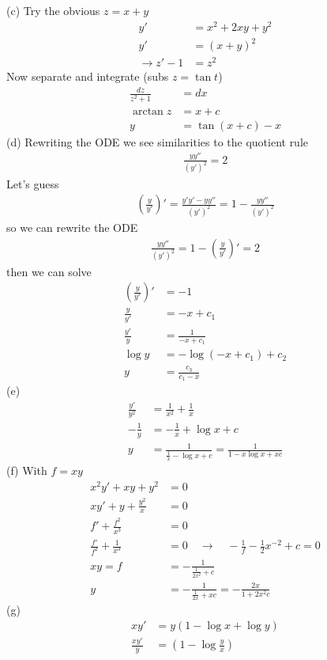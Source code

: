 \documentclass[../main.tex]{subfiles}
\begin{document}
(c) Try the obvious $z=x+y$
\begin{align}
y'&=x^2+2xy+y^2\\
y'&=(x+y)^2\\
\rightarrow z'-1&=z^2
\end{align}
Now separate and integrate (subs $z=\tan t$)
\begin{align}
\frac{dz}{z^2+1}&=dx\\
\arctan z&=x+c\\
y&=\tan(x+c)-x
\end{align}
(d) Rewriting the ODE we see similarities to the quotient rule
\begin{align}
\frac{yy''}{(y')^2}=2
\end{align}
Let's guess
\begin{align}
\left(\frac{y}{y'}\right)'=\frac{y'y'-yy''}{(y')^2}=1-\frac{yy''}{(y')^2}
\end{align}
so we can rewrite the ODE
\begin{align}
\frac{yy''}{(y')^2}=1-\left(\frac{y}{y'}\right)'=2
\end{align}
then we can solve
\begin{align}
\left(\frac{y}{y'}\right)'&=-1\\
\frac{y}{y'}&=-x+c_1\\
\frac{y'}{y}&=\frac{1}{-x+c_1}\\
\log y&=-\log(-x+c_1)+c_2\\
y&=\frac{c_3}{c_1-x}
\end{align}
(e)
\begin{align}
\frac{y'}{y^2}&=\frac{1}{x^2}+\frac{1}{x}\\
-\frac{1}{y}&=-\frac{1}{x}+\log x+c\\
y&=\frac{1}{\frac{1}{x}-\log x+c}=\frac{1}{1-x\log x+xc}
\end{align}
(f) With $f=xy$
\begin{align}
x^2y'+xy+y^2&=0\\
xy'+y+\frac{y^2}{x}&=0\\
f'+\frac{f^2}{x^3}&=0\\
\frac{f'}{f^2}+\frac{1}{x^3}&=0
\quad\rightarrow\quad-\frac{1}{f}-\frac{1}{2}x^{-2}+c=0\\
xy=f&=-\frac{1}{\frac{1}{2x^2}+c}\\
y&=-\frac{1}{\frac{1}{2x}+xc}=-\frac{2x}{1+2x^2c}
\end{align}
(g)
\begin{align}
xy'&=y(1-\log x+\log y)\\
\frac{xy'}{y}&=(1-\log\frac{y}{x})
\end{align}
\end{document}
